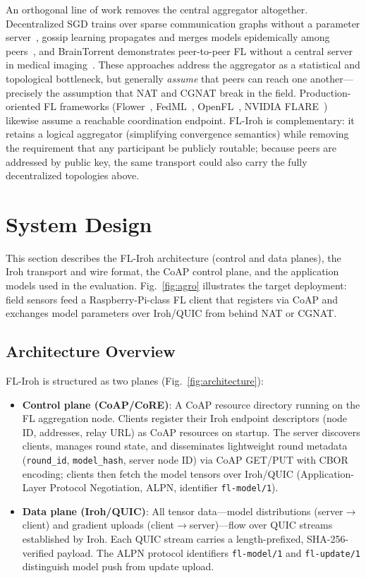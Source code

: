 ﻿\documentclass[journal]{IEEEtran}
\begin{document}
An orthogonal line of work removes the central aggregator altogether. Decentralized SGD trains over sparse communication graphs without a parameter server~\cite{lian2017}, gossip learning propagates and merges models epidemically among peers~\cite{hegedus2019}, and BrainTorrent demonstrates peer-to-peer FL without a central server in medical imaging~\cite{roy2019braintorrent}. These approaches address the aggregator as a statistical and topological bottleneck, but generally \emph{assume} that peers can reach one another---precisely the assumption that NAT and CGNAT break in the field. Production-oriented FL frameworks (Flower~\cite{flower2022}, FedML~\cite{fedml2020}, OpenFL~\cite{openfl2022}, NVIDIA FLARE~\cite{flare2022}) likewise assume a reachable coordination endpoint. FL-Iroh is complementary: it retains a logical aggregator (simplifying convergence semantics) while removing the requirement that any participant be publicly routable; because peers are addressed by public key, the same transport could also carry the fully decentralized topologies above.

\section{System Design}
\label{sec:system}

This section describes the FL-Iroh architecture (control and data planes), the Iroh transport and wire format, the CoAP control plane, and the application models used in the evaluation. Fig.~\ref{fig:agro} illustrates the target deployment: field sensors feed a Raspberry-Pi-class FL client that registers via CoAP and exchanges model parameters over Iroh/QUIC from behind NAT or CGNAT.

\subsection{Architecture Overview}

FL-Iroh is structured as two planes (Fig.~\ref{fig:architecture}):

\begin{itemize}
    \item \textbf{Control plane (CoAP/CoRE)}: A CoAP resource directory running on the FL aggregation node. Clients register their Iroh endpoint descriptors (node ID, addresses, relay URL) as CoAP resources on startup. The server discovers clients, manages round state, and disseminates lightweight round metadata (\texttt{round\_id}, \texttt{model\_hash}, server node ID) via CoAP GET/PUT with CBOR encoding; clients then fetch the model tensors over Iroh/QUIC (Application-Layer Protocol Negotiation, ALPN, identifier \texttt{fl-model/1}).
    \item \textbf{Data plane (Iroh/QUIC)}: All tensor data---model distributions (server$\to$client) and gradient uploads (client$\to$server)---flow over QUIC streams established by Iroh. Each QUIC stream carries a length-prefixed, SHA-256-verified payload. The ALPN protocol identifiers \texttt{fl-model/1} and \texttt{fl-update/1} distinguish model push from update upload.
\end{itemize}
\end{document}
